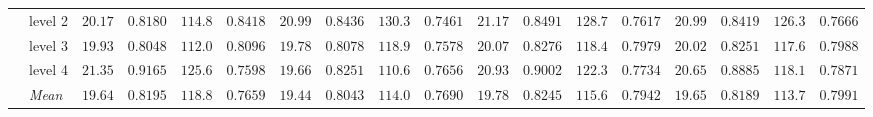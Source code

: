 \begin{table}[htbp]
\begin{tabular}{llrrrrrrrrrrrrrrrr}
 & level 2 & {\boldmath$20.17$} & {\boldmath$0.8180$} & {\boldmath$114.8$} & {\boldmath$0.8418$} & $20.99$ & $0.8436$ & $130.3$ & $0.7461$ & $21.17$ & $0.8491$ & $128.7$ & $0.7617$ & $20.99$ & $0.8419$ & $126.3$ & $0.7666$ \\
 & level 3 & $19.93$ & {\boldmath$0.8048$} & {\boldmath$112.0$} & {\boldmath$0.8096$} & {\boldmath$19.78$} & $0.8078$ & $118.9$ & $0.7578$ & $20.07$ & $0.8276$ & $118.4$ & $0.7979$ & $20.02$ & $0.8251$ & $117.6$ & $0.7988$ \\
 & level 4 & $21.35$ & $0.9165$ & $125.6$ & $0.7598$ & {\boldmath$19.66$} & {\boldmath$0.8251$} & {\boldmath$110.6$} & $0.7656$ & $20.93$ & $0.9002$ & $122.3$ & $0.7734$ & $20.65$ & $0.8885$ & $118.1$ & {\boldmath$0.7871$} \\
 & \textit{Mean} & $19.64$ & $0.8195$ & $118.8$ & $0.7659$ & \colorbox{green!20}{\boldmath$19.44$} & \colorbox{green!20}{\boldmath$0.8043$} & $114.0$ & $0.7690$ & $19.78$ & $0.8245$ & $115.6$ & $0.7942$ & $19.65$ & $0.8189$ & \colorbox{green!20}{\boldmath$113.7$} & \colorbox{green!20}{\boldmath$0.7991$} \\
\bottomrule
\end{tabular}
\end{table}
